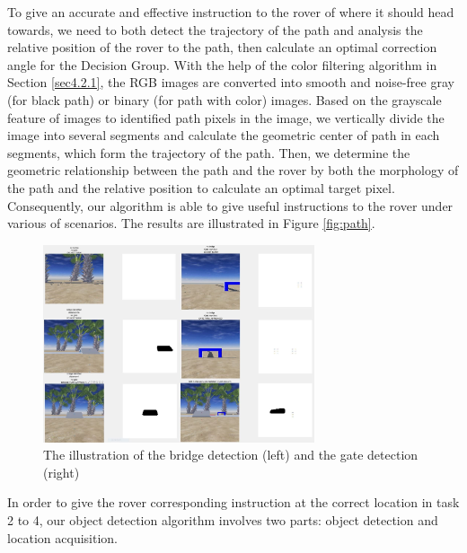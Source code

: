To give an accurate and effective instruction to the rover of where it should head towards, we need to both detect the trajectory of the path and analysis the relative position of the rover to the path, then calculate an optimal correction angle for the Decision Group. With the help of the color filtering algorithm in Section \ref{sec4.2.1}, the RGB images are converted into smooth and noise-free gray (for black path) or binary (for path with color) images. Based on the grayscale feature of images to identified path pixels in the image, we vertically divide the image into several segments and calculate the geometric center of path in each segments, which form the trajectory of the path\cite{gao2012new}. Then, we determine the geometric relationship between the path and the rover by both the morphology of the path and the relative position to calculate an optimal target pixel. Consequently, our algorithm is able to give useful instructions to the rover under various of scenarios. The results are illustrated in Figure \ref{fig:path}.

\begin{figure}[htbp]
    \centering
    \includegraphics[width=8cm]{implementation/img_wen/object_detection.jpg}
    \caption{The illustration of the bridge detection (left) and the gate detection (right)}
    \label{fig:bridge_and_gate detection}
\end{figure}

In order to give the rover corresponding instruction at the correct location in task 2 to 4, our object detection algorithm involves two parts: object detection and location acquisition.

